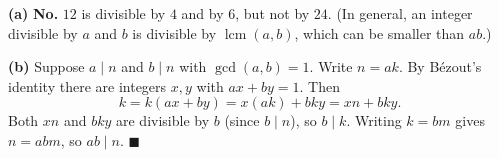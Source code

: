 \textbf{(a)} \textbf{No.} $12$ is divisible by $4$ and by $6$, but not by $24$. (In general, an integer divisible by $a$ and $b$ is divisible by $\operatorname{lcm}(a,b)$, which can be smaller than $ab$.)

\textbf{(b)} Suppose $a\mid n$ and $b\mid n$ with $\gcd(a,b)=1$. Write $n=ak$. By B\'ezout's identity there are integers $x,y$ with $ax+by=1$. Then
\[k=k(ax+by)=x(ak)+bky=xn+bky.\]
Both $xn$ and $bky$ are divisible by $b$ (since $b\mid n$), so $b\mid k$. Writing $k=bm$ gives $n=abm$, so $ab\mid n$. $\blacksquare$

